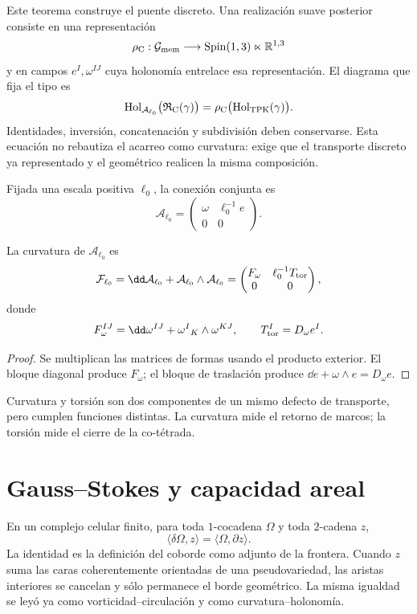 Este teorema construye el puente discreto. Una realización suave posterior
consiste en una representación
\[
 \rho_{\rm C}:\mathcal G_{\rm mem}
 \longrightarrow\operatorname{Spin}(1,3)\ltimes\mathbb R^{1,3}
\]
y en campos \(e^I,\omega^{IJ}\) cuya holonomía entrelace esa representación.
El diagrama que fija el tipo es
\[
 \operatorname{Hol}_{\mathcal A_{\ell_0}}
   \bigl(\mathfrak R_{\rm C}(\gamma)\bigr)
 =
 \rho_{\rm C}\bigl(\operatorname{Hol}_{\rm TPK}(\gamma)\bigr).
\]
Identidades, inversión, concatenación y subdivisión deben conservarse.  Esta
ecuación no rebautiza el acarreo como curvatura: exige que el transporte
discreto ya representado y el geométrico realicen la misma composición.

Fijada una escala positiva \(\ell_0\), la conexión conjunta es
\[
 \mathcal A_{\ell_0}
 =
 \begin{pmatrix}
 \omega&\ell_0^{-1}e\\
 0&0
 \end{pmatrix}.
\]

\begin{proposition}
\label{prop:curvatura-conjunta-cartan-rev6}
La curvatura de \(\mathcal A_{\ell_0}\) es
\[
 \mathcal F_{\ell_0}
 =\dd\mathcal A_{\ell_0}
  +\mathcal A_{\ell_0}\wedge\mathcal A_{\ell_0}
 =
 \begin{pmatrix}
 F_\omega&\ell_0^{-1}T_{\rm tor}\\
 0&0
 \end{pmatrix},
\]
donde
\[
 F_\omega^{IJ}
 =\dd\omega^{IJ}+\omega^I{}_K\wedge\omega^{KJ},
 \qquad
 T_{\rm tor}^{I}=D_\omega e^I.
\]
\end{proposition}

\begin{proof}
Se multiplican las matrices de formas usando el producto exterior.  El
bloque diagonal produce \(F_\omega\); el bloque de traslación produce
\(\dd e+\omega\wedge e=D_\omega e\).
\end{proof}

Curvatura y torsión son dos componentes de un mismo defecto de transporte,
pero cumplen funciones distintas.  La curvatura mide el retorno de marcos;
la torsión mide el cierre de la co-tétrada.

\section{Gauss--Stokes y capacidad areal}

En un complejo celular finito, para toda \(1\)-cocadena \(\Omega\) y toda
\(2\)-cadena \(z\),
\[
 \boxed{\quad
 \langle\delta\Omega,z\rangle
 =\langle\Omega,\partial z\rangle.
 \quad}
\]
La identidad es la definición del coborde como adjunto de la frontera.
Cuando \(z\) suma las caras coherentemente orientadas de una
pseudovariedad, las aristas interiores se cancelan y sólo permanece el
borde geométrico.  La misma igualdad se leyó ya como
vorticidad--circulación y como curvatura--holonomía.

